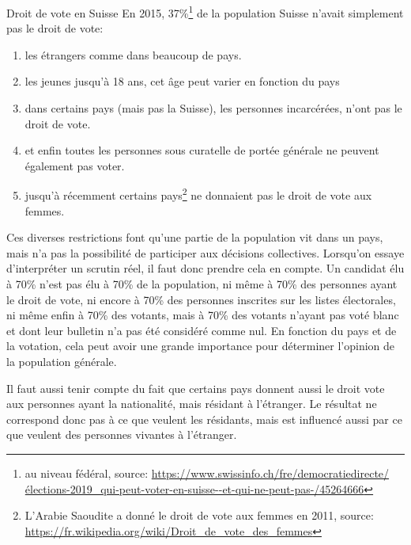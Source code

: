 \documentclass[../report]{subfiles}
\begin{document}
  \begin{nota}{Droit de vote en Suisse}
    En 2015, 37\%\footnote{au niveau fédéral, source: \url{https://www.swissinfo.ch/fre/democratiedirecte/élections-2019\_qui-peut-voter-en-suisse--et-qui-ne-peut-pas-/45264666}}
    de la population Suisse n'avait simplement pas le droit de vote:
    \begin{enumerate}
      \item les étrangers comme dans beaucoup de pays.
      \item les jeunes jusqu'à 18 ans, cet âge peut varier en fonction du pays
      \item dans certains pays (mais pas la Suisse), les personnes incarcérées, n'ont pas 
        le droit de vote.
      \item et enfin toutes les personnes sous curatelle de portée générale ne peuvent 
        également pas voter.
      \item jusqu'à récemment certains pays\footnote{L'Arabie Saoudite a donné le droit de vote aux femmes en 2011, source: \url{https://fr.wikipedia.org/wiki/Droit\_de\_vote\_des\_femmes}} ne donnaient pas le droit de vote aux femmes.
    \end{enumerate}
  \end{nota}

  Ces diverses restrictions font qu'une partie de la population vit dans un pays, mais n'a
  pas la possibilité de participer aux décisions collectives.
  Lorsqu'on essaye d'interpréter un scrutin réel, il faut donc prendre cela en compte.
  Un candidat élu à 70\% n'est pas élu à 70\% de la population, ni même à 70\% des personnes
  ayant le droit de vote, ni encore à 70\% des personnes inscrites sur les listes électorales,
  ni même enfin à 70\% des votants, mais à 70\% des votants n'ayant pas voté blanc et dont leur 
  bulletin n'a pas été considéré comme nul.
  En fonction du pays et de la votation, cela peut avoir une grande importance pour déterminer l'opinion de la population générale.

  Il faut aussi tenir compte du fait que certains pays donnent aussi le droit vote aux personnes ayant la nationalité, mais 
  résidant à l'étranger.
  Le résultat ne correspond donc pas à ce que veulent les résidants, mais est influencé aussi par ce
  que veulent des personnes vivantes à l'étranger.
\end{document}
